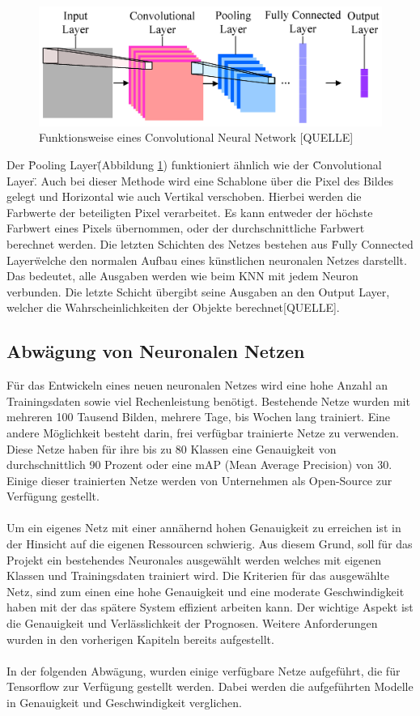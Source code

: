 \documentclass[a4paper,12pt,oneside]{article}
\begin{document}
\begin{figure}
    [h]
	\centering
	\includegraphics[scale=1.5]{Sources/cnn.png}
		\caption{Funktionsweise eines Convolutional Neural Network [QUELLE]}
	\label{img:CNN}
\end{figure}

Der \"Pooling Layer\" (Abbildung \ref{img:CNN}) funktioniert ähnlich wie der \"Convolutional Layer\". Auch bei dieser Methode wird eine Schablone über die Pixel des Bildes gelegt und Horizontal wie auch Vertikal verschoben. Hierbei werden die Farbwerte der beteiligten Pixel verarbeitet. Es kann entweder der höchste Farbwert eines Pixels übernommen, oder der durchschnittliche Farbwert berechnet werden. Die letzten Schichten des Netzes bestehen aus \"Fully Connected Layer\" welche den normalen Aufbau eines künstlichen neuronalen Netzes darstellt. Das bedeutet, alle Ausgaben werden wie beim KNN mit jedem Neuron verbunden. Die letzte Schicht übergibt seine Ausgaben an den Output Layer, welcher die Wahrscheinlichkeiten der Objekte berechnet[QUELLE].
  
  \subsection{Abwägung von Neuronalen Netzen} 
Für das Entwickeln eines neuen neuronalen Netzes wird eine hohe Anzahl an Trainingsdaten sowie viel Rechenleistung benötigt. Bestehende Netze wurden mit mehreren 100 Tausend Bilden, mehrere Tage, bis Wochen lang trainiert. Eine andere Möglichkeit besteht darin, frei verfügbar trainierte Netze zu verwenden. Diese Netze haben für ihre bis zu 80 Klassen eine Genauigkeit von durchschnittlich 90 Prozent oder eine mAP (Mean Average Precision) von 30. Einige dieser trainierten Netze werden von Unternehmen als Open-Source zur Verfügung gestellt.
\\
\\
Um ein eigenes Netz mit einer annähernd hohen Genauigkeit zu erreichen ist in der Hinsicht auf die eigenen Ressourcen schwierig. Aus diesem Grund, soll für das Projekt ein bestehendes Neuronales ausgewählt werden welches mit eigenen Klassen und Trainingsdaten trainiert wird. Die Kriterien für das ausgewählte Netz, sind zum einen eine hohe Genauigkeit und eine moderate Geschwindigkeit haben mit der das spätere System effizient arbeiten kann. Der wichtige Aspekt ist die Genauigkeit und Verlässlichkeit der Prognosen. Weitere Anforderungen wurden in den vorherigen Kapiteln bereits aufgestellt.
\\
\\
In der folgenden Abwägung, wurden einige verfügbare Netze aufgeführt, die für Tensorflow zur Verfügung gestellt werden. Dabei werden die aufgeführten Modelle in Genauigkeit und Geschwindigkeit verglichen.
 
\end{document}
